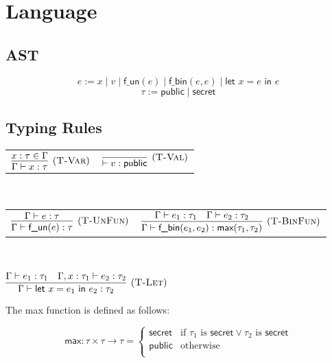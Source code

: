 \documentclass{article}
\begin{document}
\section{Language}
\subsection{AST}

\[ e := x \mid v \mid \textsf{f\_un}(e) \mid \textsf{f\_bin}(e, e) \mid \textsf{let } x = e \textsf{ in } e \]
\[ \tau := \textsf{public} \mid \textsf{secret} \]


\subsection{Typing Rules}

\begin{center}
\begin{tabular}{cc}
$\infer[(\textsc{T-Var})]{
    \Gamma \vdash x : \tau
}{
    x : \tau \in \Gamma
}$ &

$\infer[(\textsc{T-Val})]{
    \vdash v : \textsf{public}
}{}$
\end{tabular} \\
\end{center}

\begin{center}
\begin{tabular}{cc}
$\infer[(\textsc{T-UnFun})]{ \Gamma \vdash \textsf{f\_un}(e) : \tau }{ \Gamma \vdash e : \tau }$ &

$\infer[(\textsc{T-BinFun})]{ 
    \Gamma \vdash \textsf{f\_bin}(e_1, e_2) : \textsf{max}(\tau_1, \tau_2) 
}{
    \Gamma \vdash e_1 : \tau_1
    & \Gamma \vdash e_2 : \tau_2
}$
\end{tabular} \\
\end{center}

\begin{center}
$\infer[(\textsc{T-Let})]{
    \Gamma \vdash \textsf{let } x = e_1 \textsf{ in } e_2 : \tau_2
}{
    \Gamma \vdash e_1 : \tau_1
    & \Gamma, x : \tau_1 \vdash e_2 : \tau_2
}$
\end{center}

\vspace{0.25cm}

The \textsf{max} function is defined as follows:

\[ \textsf{max} : \tau \times \tau \rightarrow \tau = \begin{cases} 
	\textsf{secret} & \text{if } \tau_1 \text{ is }  \textsf{secret} \lor \tau_2 \text{ is }  \textsf{secret} \\
         \textsf{public} & \text{otherwise} \\
\end{cases} \]
\\
\end{document}
